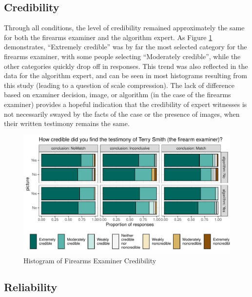 \documentclass[print]{nuthesis}
\begin{document}
\hypertarget{credibility}{%
\subsection{Credibility}\label{credibility}}

Through all conditions, the level of credibility remained approximately the same for both the firearms examiner and the algorithm expert.
As Figure \ref{fig:cred} demonstrates, ``Extremely credible'' was by far the most selected category for the firearms examiner, with some people selecting ``Moderately credible'', while the other categories quickly drop off in responses.
This trend was also reflected in the data for the algorithm expert, and can be seen in most histograms resulting from this study (leading to a question of scale compression).
The lack of difference based on examiner decision, image, or algorithm (in the case of the firearms examiner) provides a hopeful indication that the credibility of expert witnesses is not necessarily swayed by the facts of the case or the presence of images, when their written testimony remains the same.

\begin{figure}

{\centering \includegraphics[width=\linewidth]{thesis_files/figure-latex/cred-1} 

}

\caption{Histogram of Firearms Examiner Credibility}\label{fig:cred}
\end{figure}

\hypertarget{reliability}{%
\subsection{Reliability}\label{reliability}}
\end{document}
